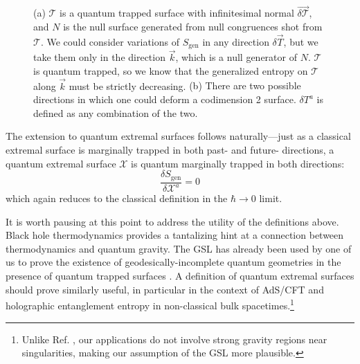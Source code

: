 \documentclass[12pt]{article}
\theoremstyle{remark}
\numberwithin{equation}{section}
\numberwithin{equation}{section}
\begin{document}
\begin{figure}[t]
\centering

\qquad
{}
\caption{ (a) {\small $\mathcal{T}$ is a quantum trapped surface with infinitesimal normal $\vec{\delta \mathcal{T}}$, and $N$ is the null surface generated from null congruences shot from $\mathcal{T}$. We could consider variations of $S_{\mathrm{gen}}$ in any direction $\delta \vec{T}$, but we take them only in the direction $\vec{k}$, which is a null generator of $N$. $\mathcal{T}$ is quantum trapped, so we know that the generalized entropy on $\mathcal{T}$ along $\vec{k}$ must be strictly decreasing.} (b) There are two possible directions in which one could deform a codimension 2 surface. $\delta T^{a}$ is defined as any combination of the two.}
\label{Thm3}
\end{figure}

The extension to quantum extremal surfaces follows naturally---just as a classical extremal surface is marginally trapped in both past- and future- directions, a quantum extremal surface $\mathcal{X}$ is quantum marginally trapped in both directions:
\begin{equation} \frac{\delta S_\mathrm{gen}}{\delta \mathcal{X}^{a}}=0\end{equation}
which again reduces to the classical definition in the $\hbar \to 0$ limit.

It is worth pausing at this point to address the utility of the definitions above. Black hole thermodynamics provides a tantalizing hint at a connection between thermodynamics and quantum gravity. The GSL has already been used by one of us to prove the existence of geodesically-incomplete quantum geometries in the presence of quantum trapped surfaces \cite{Wall12}.  A definition of quantum extremal surfaces should prove similarly useful, in particular in the context of AdS/CFT and holographic entanglement entropy in non-classical bulk spacetimes.\footnote{Unlike Ref. \cite{Wall12}, our applications do not involve strong gravity regions near singularities, making our assumption of the GSL more plausible.}
\end{document}
